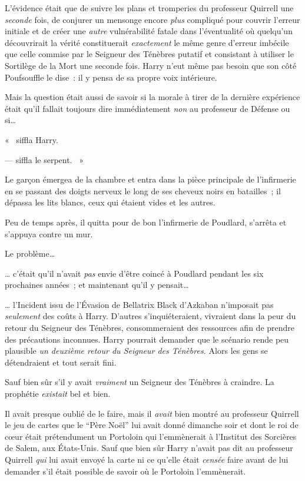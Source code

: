 L'évidence était que de suivre les plans et tromperies du professeur Quirrell une \emph{seconde} fois, de conjurer un mensonge encore \emph{plus} compliqué pour couvrir l'erreur initiale et de créer une \emph{autre} vulnérabilité fatale dans l'éventualité où quelqu'un découvrirait la vérité constituerait \emph{exactement} le même genre d'erreur imbécile que celle commise par le Seigneur des Ténèbres putatif et consistant à utiliser le Sortilège de la Mort une seconde fois. Harry n'eut même pas besoin que son côté Poufsouffle le dise~: il y pensa de sa propre voix intérieure.

Mais la question était aussi de savoir si la morale à tirer de la dernière expérience était qu'il fallait toujours dire immédiatement \emph{non} au professeur de Défense ou si…

«~ siffla Harry. 

---  siffla le serpent. ~»

\later

Le garçon émergea de la chambre et entra dans la pièce principale de l'infirmerie en se passant des doigts nerveux le long de ses cheveux noirs en batailles~; il dépassa les lits blancs, ceux qui étaient vides et les autres.

Peu de temps après, il quitta pour de bon l'infirmerie de Poudlard, s'arrêta et s'appuya contre un mur.

Le problème…

… c'était qu'il n'avait \emph{pas} envie d'être coincé à Poudlard pendant les six prochaines années~; et maintenant qu'il y pensait…

… l'Incident issu de l'Évasion de Bellatrix Black d'Azkaban n'imposait pas \emph{seulement} des coûts à Harry. D'autres s'inquiéteraient, vivraient dans la peur du retour du Seigneur des Ténèbres, consommeraient des ressources afin de prendre des précautions inconnues. Harry pourrait demander que le scénario rende peu plausible \emph{un deuxième retour du Seigneur des Ténèbres.} Alors les gens se détendraient et tout serait fini.

Sauf bien sûr s'il y avait \emph{vraiment} un Seigneur des Ténèbres à craindre. La prophétie \emph{existait} bel et bien.

Il avait presque oublié de le faire, mais il \emph{avait} bien montré au professeur Quirrell le jeu de cartes que le “Père Noël” lui avait donné dimanche soir et dont le roi de cœur était prétendument un Portoloin qui l'emmènerait à l'Institut des Sorcières de Salem, aux États-Unis. Sauf que bien sûr Harry n'avait pas dit au professeur Quirrell \emph{qui} lui avait envoyé la carte ni ce qu'elle était \emph{censée} faire avant de lui demander s'il était possible de savoir où le Portoloin l'emmènerait.

